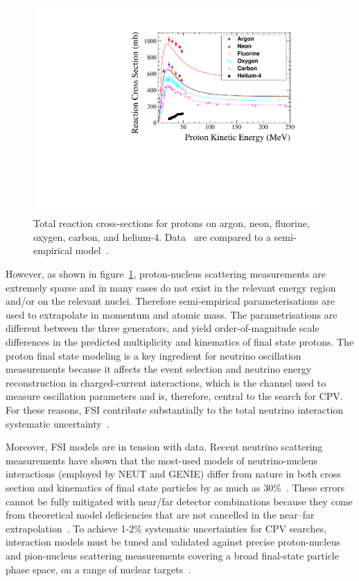 \begin{figure}%
    \centering
    \includegraphics[width=12cm]{files/Figures/DataProtonCrossSections.pdf}%
    \caption{Total reaction cross-sections for protons on argon, neon, fluorine, oxygen, carbon, and helium-4. Data~\cite{Carlson:1996ofz} are compared to a semi-empirical model~\cite{wellisch1996total}.}
    \label{fig:DataProtonXSec}%
\end{figure}

However, as shown in figure~\ref{fig:DataProtonXSec}, proton-nucleus scattering measurements are extremely sparse and in many cases do not exist in the relevant energy region and/or on the relevant nuclei.
Therefore semi-empirical parameterisations are used to extrapolate in momentum and atomic mass.  
The parametrisations are different between the three generators, and yield order-of-magnitude scale differences in the predicted multiplicity and kinematics of final state protons.
The proton final state modeling is a key ingredient for neutrino oscillation measurements because it affects the event selection and neutrino energy reconstruction in charged-current interactions, which is the channel used to measure oscillation parameters and is, therefore, central to the search for CPV\cite{Abe:2013hdq}.
For these reasons, FSI contribute substantially to the total neutrino interaction systematic uncertainty~\cite{Abe:2019vii}. 

Moreover, FSI models are in tension with data.  
Recent neutrino scattering measurements have shown that the most-used models of neutrino-nucleus interactions (employed by NEUT and GENIE) differ from nature in both cross section and kinematics of final state particles by as much as 30\%~\cite{McFarland:2018aaa}. 
These errors cannot be fully mitigated with near/far detector combinations because they come from theoretical model deficiencies that are not cancelled in the near–far extrapolation~\cite{Coloma:2013rqa}. 
To achieve 1-2\% systematic uncertainties for CPV searches, interaction models must be tuned and validated against precise proton-nucleus and pion-nucleus scattering measurements covering a broad final-state particle phase space, on a range of nuclear targets~\cite{Cao:2014zra}.

